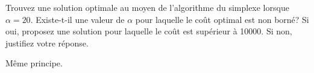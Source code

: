 \begin{enumerate}
    Trouvez une solution optimale au moyen de l'algorithme du simplexe lorsque $\alpha=20$.  Existe-t-il une valeur de $\alpha$ pour laquelle le coût optimal
    est non borné? Si oui,  proposez une solution pour laquelle le coût  est supérieur à 10000. Si non, justifiez votre réponse.

    \begin{solution}
      Même principe.
    \end{solution}

\end{enumerate}
